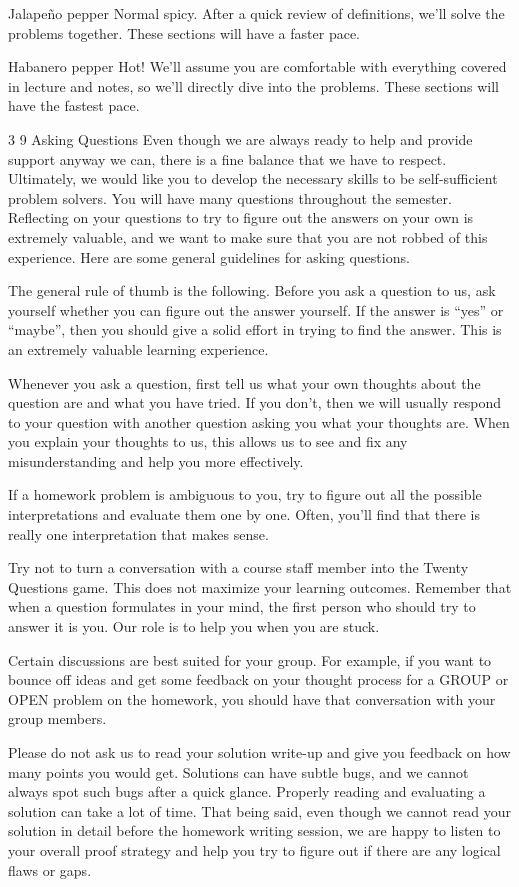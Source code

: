 Jalapeño pepper Normal spicy. After a quick review of definitions, we’ll solve the problems together. These sections will have a faster pace.

Habanero pepper Hot! We’ll assume you are comfortable with everything covered in lecture and notes, so we’ll directly dive into the problems. These sections will have the fastest pace.

 3
9  Asking Questions
Even though we are always ready to help and provide support anyway we can, there is a fine balance that we have to respect. Ultimately, we would like you to develop the necessary skills to be self-sufficient problem solvers. You will have many questions throughout the semester. Reflecting on your questions to try to figure out the answers on your own is extremely valuable, and we want to make sure that you are not robbed of this experience. Here are some general guidelines for asking questions.

The general rule of thumb is the following. Before you ask a question to us, ask yourself whether you can figure out the answer yourself. If the answer is “yes” or “maybe”, then you should give a solid effort in trying to find the answer. This is an extremely valuable learning experience.

Whenever you ask a question, first tell us what your own thoughts about the question are and what you have tried. If you don’t, then we will usually respond to your question with another question asking you what your thoughts are. When you explain your thoughts to us, this allows us to see and fix any misunderstanding and help you more effectively.

If a homework problem is ambiguous to you, try to figure out all the possible interpretations and evaluate them one by one. Often, you’ll find that there is really one interpretation that makes sense.

Try not to turn a conversation with a course staff member into the Twenty Questions game. This does not maximize your learning outcomes. Remember that when a question formulates in your mind, the first person who should try to answer it is you. Our role is to help you when you are stuck.

Certain discussions are best suited for your group. For example, if you want to bounce off ideas and get some feedback on your thought process for a GROUP or OPEN problem on the homework, you should have that conversation with your group members.

Please do not ask us to read your solution write-up and give you feedback on how many points you would get. Solutions can have subtle bugs, and we cannot always spot such bugs after a quick glance. Properly reading and evaluating a solution can take a lot of time. That being said, even though we cannot read your solution in detail before the homework writing session, we are happy to listen to your overall proof strategy and help you try to figure out if there are any logical flaws or gaps.


